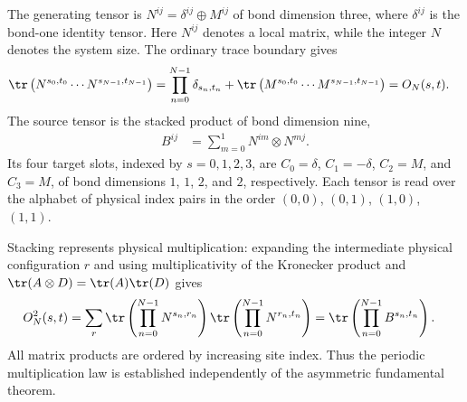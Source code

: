 \begin{definition}
    \label{def:asymex_czx_plus}
    \leanok
    The generating tensor is $N^{ij}=\delta^{ij}\oplus M^{ij}$ of bond
    dimension three, where $\delta^{ij}$ is the bond-one identity tensor.
    Here $N^{ij}$ denotes a local matrix, while the integer $N$ denotes
    the system size. The ordinary trace boundary gives
    \begin{align}
        \tr\left(N^{s_0,t_0}\cdots N^{s_{N-1},t_{N-1}}\right)
         & =\prod_{n=0}^{N-1}\delta_{s_n,t_n}
        +\tr\left(M^{s_0,t_0}\cdots M^{s_{N-1},t_{N-1}}\right)
        =O_N(s,t).
        \notag
    \end{align}
    The source tensor is the stacked product of bond dimension nine,
    \begin{align}
        B^{ij} & =\sum_{m=0}^{1}N^{im}\otimes N^{mj}.
        \label{eq:asymex_plus_stack}
    \end{align}
    Its four target slots, indexed by $s=0,1,2,3$, are
    $C_0=\delta$, $C_1=-\delta$, $C_2=M$, and $C_3=M$, of bond dimensions
    $1$, $1$, $2$, and $2$, respectively. Each tensor is read over the
    alphabet of physical index pairs in the order
    $(0,0)$, $(0,1)$, $(1,0)$, $(1,1)$.
\end{definition}

Stacking represents physical multiplication: expanding the intermediate
physical configuration $r$ and using multiplicativity of the Kronecker
product and $\tr(A\otimes D)=\tr(A)\tr(D)$ gives
\begin{align}
    O_N^2(s,t)
     & =\sum_r
    \tr\left(\prod_{n=0}^{N-1}N^{s_n,r_n}\right)
    \tr\left(\prod_{n=0}^{N-1}N^{r_n,t_n}\right)
    =\tr\left(\prod_{n=0}^{N-1}B^{s_n,t_n}\right).
    \label{eq:asymex_plus_contraction}
\end{align}
All matrix products are ordered by increasing site index. Thus the
periodic multiplication law is established independently of the
asymmetric fundamental theorem.


